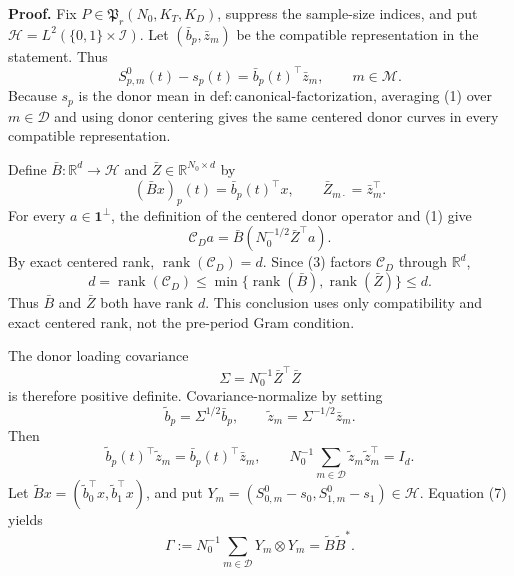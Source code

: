 \textbf{Proof.}
Fix \(P\in\mathfrak P_r(N_0,K_T,K_D)\), suppress the sample-size indices,
and put \(\mathcal H=L^2(\{0,1\}\times\mathcal I)\).  Let
\((\bar b_p,\bar z_m)\) be the compatible representation in the statement.
Thus
\[
 S^0_{p,m}(t)-s_p(t)=\bar b_p(t)^\top\bar z_m,
 \qquad m\in\mathcal M.                                  \tag{1}
\]
Because \(s_p\) is the donor mean in
\(\mathrm{def:canonical\mbox{-}factorization}\), averaging (1) over
\(m\in\mathcal D\) and using donor centering gives the same centered donor
curves in every compatible representation.

Define \(\bar B:\mathbb R^d\to\mathcal H\) and
\(\bar Z\in\mathbb R^{N_0\times d}\) by
\[
 (\bar Bx)_p(t)=\bar b_p(t)^\top x,
 \qquad \bar Z_{m\cdot}=\bar z_m^\top.                  \tag{2}
\]
For every \(a\in\mathbf 1^\perp\), the definition of the centered donor
operator and (1) give
\[
 \mathcal C_Da
 =\bar B\left(N_0^{-1/2}\bar Z^\top a\right).           \tag{3}
\]
By exact centered rank, \(\operatorname{rank}(\mathcal C_D)=d\).  Since
(3) factors \(\mathcal C_D\) through \(\mathbb R^d\),
\[
 d=\operatorname{rank}(\mathcal C_D)
 \leq\min\{\operatorname{rank}(\bar B),
             \operatorname{rank}(\bar Z)\}\leq d.       \tag{4}
\]
Thus \(\bar B\) and \(\bar Z\) both have rank \(d\).  This conclusion uses
only compatibility and exact centered rank, not the pre-period Gram condition.

The donor loading covariance
\[
 \Sigma=N_0^{-1}\bar Z^\top\bar Z                       \tag{5}
\]
is therefore positive definite.  Covariance-normalize by setting
\[
 \widetilde b_p=\Sigma^{1/2}\bar b_p,
 \qquad \widetilde z_m=\Sigma^{-1/2}\bar z_m.           \tag{6}
\]
Then
\[
 \widetilde b_p(t)^\top\widetilde z_m
 =\bar b_p(t)^\top\bar z_m,
 \qquad
 N_0^{-1}\sum_{m\in\mathcal D}
 \widetilde z_m\widetilde z_m^\top=I_d.                 \tag{7}
\]
Let \(\widetilde Bx=(\widetilde b_0^\top x,
\widetilde b_1^\top x)\), and put
\(Y_m=(S^0_{0,m}-s_0,S^0_{1,m}-s_1)\in\mathcal H\).  Equation (7) yields
\[
 \Gamma:=N_0^{-1}\sum_{m\in\mathcal D}Y_m\otimes Y_m
 =\widetilde B\widetilde B^*.                            \tag{8}
\]

